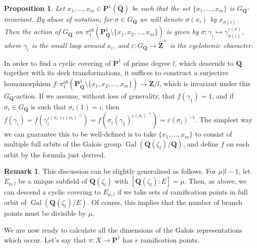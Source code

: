 \documentclass{article}
\newtheorem{proposition}[theorem]{Proposition}
\theoremstyle{definition}
\newtheorem*{remark}{Remark}
\DeclareMathOperator{\Gal}{\mathrm{Gal}}
\begin{document}
	\begin{proposition} \cite[Corollary I.2.7]{malle}
		Let $x_1, \ldots, x_m \in \mathbf{P}^1(\overline{\mathbf{Q}})$ be such that the set $\{x_1, \ldots, x_m \}$ is $G_{\mathbf{Q}}$-invariant. By abuse of notation, for $\sigma \in G_{\mathbf{Q}}$ we will denote $\sigma(x_i)$ by $x_{\sigma(i)}$. Then the action of $G_{\mathbf{Q}}$ on $\pi_1^{ab}(\mathbf{P}^1_{\overline{\mathbf{Q}}} \setminus \{x_1, x_2, \ldots, x_m\})$ is given by $\sigma : \gamma_i \mapsto \gamma_{\sigma(i)}^{\varepsilon(\sigma)}$, where $\gamma_i$ is the small loop around $x_i$, and $\varepsilon : G_{\mathbf{Q}} \to \widehat{\mathbf{Z}} ^ {\times}$ is the cyclotomic character.
	\end{proposition}
	In order to find a cyclic covering of $\mathbf{P}^1$ of prime degree $l$, which descends to $\mathbf{Q}$ together with its deck transformations, it suffices to construct a surjective homomorphism $f : \pi_1^{ab}(\mathbf{P}^1_{\overline{\mathbf{Q}}} \setminus \{x_1, x_2, \ldots, x_m\}) \to \mathbf{Z}/l$, which is invariant under this $G_{\mathbf{Q}}$-action. If we assume, without loss of generality, that $f(\gamma_1)=1$, and if $\sigma_i \in G_{\mathbf{Q}}$ is such that $\sigma_i(1)=i$, then $f(\gamma_i) = f(\gamma_i ^{\varepsilon(\sigma_i) \varepsilon(\sigma_i)^{-1}}) = f(\sigma_i(\gamma_1)^{\varepsilon(\sigma_i)^{-1}}) = \varepsilon(\sigma_i)^{-1}$. The simplest way we can guarantee this to be well-defined is to take $\{x_1, \ldots, x_m \}$ to consist of multiple full orbits of the Galois group $\Gal(\mathbf{Q}(\zeta_l)/\mathbf{Q})$, and define $f$ on each orbit by the formula just derived. \par 
	\begin{remark}
	This discussion can be slightly generalised as follows. For $\mu | l-1$, let $E_{\mu,l}$ be a unique subfield of $\mathbf{Q}(\zeta_l)$ with $[\mathbf{Q}(\zeta_l):E]=\mu$. Then, as above, we can descend a cyclic covering to $E_{\mu, l}$ if we take sets of ramification points in full orbit of $\Gal(\mathbf{Q}(\zeta_l)/E)$. Of course, this implies that the number of branch points must be divisible by $\mu$.
	\end{remark}
	We are now ready to calculate all the dimensions of the Galois representations which occur. Let's say that $\pi : X \to \mathbf{P}^1$ has $r$ ramification points.  \par 
\end{document}
